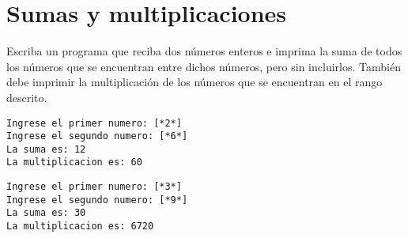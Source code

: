 \section{Sumas y multiplicaciones}

Escriba un programa que reciba dos números enteros e imprima la suma de todos los números que se encuentran entre dichos números, pero sin incluirlos. También debe imprimir la multiplicación de los números que se encuentran en el rango descrito.

\begin{lstlisting}[style=consola]
Ingrese el primer numero: [*2*]
Ingrese el segundo numero: [*6*]
La suma es: 12
La multiplicacion es: 60
\end{lstlisting}

\begin{lstlisting}[style=consola]
Ingrese el primer numero: [*3*]
Ingrese el segundo numero: [*9*]
La suma es: 30
La multiplicacion es: 6720
\end{lstlisting}
